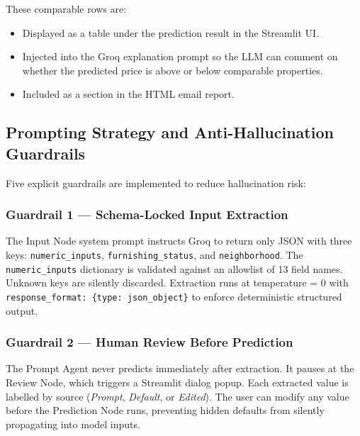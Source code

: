 \documentclass[12pt,a4paper]{article}
\begin{document}
These comparable rows are:
\begin{itemize}[leftmargin=1.5em]
  \item Displayed as a table under the prediction result in the Streamlit UI.
  \item Injected into the Groq explanation prompt so the LLM can comment on whether the predicted price is above or below comparable properties.
  \item Included as a section in the HTML email report.
\end{itemize}

\subsection{Prompting Strategy and Anti-Hallucination Guardrails}

Five explicit guardrails are implemented to reduce hallucination risk:

\subsubsection{Guardrail 1 --- Schema-Locked Input Extraction}
The Input Node system prompt instructs Groq to return only JSON with three keys: \texttt{numeric\_inputs}, \texttt{furnishing\_status}, and \texttt{neighborhood}. The \texttt{numeric\_inputs} dictionary is validated against an allowlist of 13 field names. Unknown keys are silently discarded. Extraction runs at temperature = 0 with \texttt{response\_format: \{type: json\_object\}} to enforce deterministic structured output.

\subsubsection{Guardrail 2 --- Human Review Before Prediction}
The Prompt Agent never predicts immediately after extraction. It pauses at the Review Node, which triggers a Streamlit dialog popup. Each extracted value is labelled by source (\textit{Prompt}, \textit{Default}, or \textit{Edited}). The user can modify any value before the Prediction Node runs, preventing hidden defaults from silently propagating into model inputs.
\end{document}
